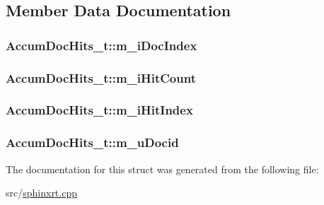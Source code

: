\subsection{Member Data Documentation}
\hypertarget{structAccumDocHits__t_a898390d1a67b5cea37b00fde4c4d1f21}{
\subsubsection[{m\-\_\-i\-Doc\-Index}]{ Accum\-Doc\-Hits\-\_\-t\-::m\-\_\-i\-Doc\-Index}}\label{structAccumDocHits__t_a898390d1a67b5cea37b00fde4c4d1f21}
\hypertarget{structAccumDocHits__t_a937f98afc69d1155c9fa0e2ab5e9e195}{
\subsubsection[{m\-\_\-i\-Hit\-Count}]{ Accum\-Doc\-Hits\-\_\-t\-::m\-\_\-i\-Hit\-Count}}\label{structAccumDocHits__t_a937f98afc69d1155c9fa0e2ab5e9e195}
\hypertarget{structAccumDocHits__t_a79516c4ce5db786fc7dc8ff4786b032d}{
\subsubsection[{m\-\_\-i\-Hit\-Index}]{ Accum\-Doc\-Hits\-\_\-t\-::m\-\_\-i\-Hit\-Index}}\label{structAccumDocHits__t_a79516c4ce5db786fc7dc8ff4786b032d}
\hypertarget{structAccumDocHits__t_a222780dcbcc7d5fd42bf5196ab47c51f}{
\subsubsection[{m\-\_\-u\-Docid}]{ Accum\-Doc\-Hits\-\_\-t\-::m\-\_\-u\-Docid}}\label{structAccumDocHits__t_a222780dcbcc7d5fd42bf5196ab47c51f}


The documentation for this struct was generated from the following file\-:\begin{DoxyCompactItemize}
\item 
src/\hyperlink{sphinxrt_8cpp}{sphinxrt.\-cpp}\end{DoxyCompactItemize}
